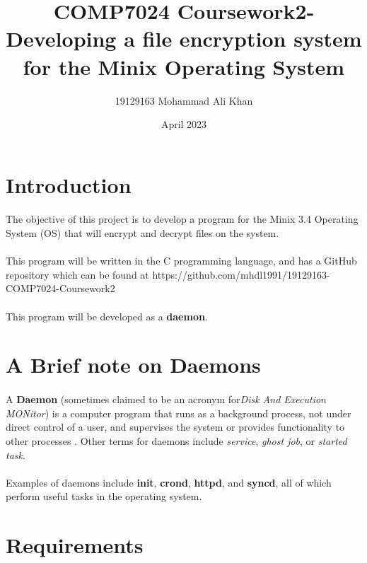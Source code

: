 \documentclass{article}
\title{COMP7024 Coursework2- Developing a file encryption system for the Minix Operating System}
\author{19129163 Mohammad Ali Khan}
\date{April 2023}
\begin{document}
\maketitle

\section{Introduction}
    \paragraph{}The objective of this project is to develop a program for the Minix 3.4 Operating System (OS) that will encrypt and decrypt files on the system.
    \paragraph{}This program will be written in the C programming language, and has a GitHub repository which can be found at https://github.com/mhdl1991/19129163-COMP7024-Coursework2
    \paragraph{}This program will be developed as a \textbf{daemon}.

\section{A Brief note on Daemons}
    \paragraph{}A \textbf{Daemon} (sometimes claimed to be an acronym for\textit{Disk And Execution MONitor}) is a computer program that runs as a background process, not under direct control of a user, and supervises the system or provides functionality to other processes . Other terms for daemons include \textit{service}, \textit{ghost job}, or \textit{started task}.
    
    \paragraph{}Examples of daemons include \textbf{init}, \textbf{crond}, \textbf{httpd}, and \textbf{syncd}, all of which perform useful tasks in the operating system.

\section{Requirements}
\end{document}
